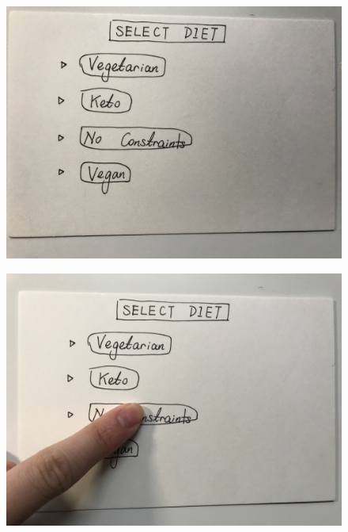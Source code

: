 \documentclass[a4paper,10pt,oneside]{scrreprt}
\begin{document}
\begin{figure}[h]
	\centering
	\includegraphics[scale=0.10, clip, trim={0em 0em 0em 0em}]{images/IMG_0561.jpg}
\end{figure}

\begin{figure}[h]
	\centering
	\includegraphics[scale=0.10, clip, trim={0em 0em 0em 0em}]{images/IMG_0563.jpg}
\end{figure}
\end{document}
